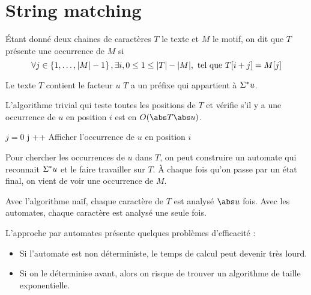 \section{String matching}

\begin{definition}
	Étant donné deux chaines de caractères $T$ le texte et $M$ le motif, on dit que $T$ présente une occurrence de $M$ si
	$$\forall j \in \left\{1,\ldots,|M| -1\right\}, \exists i, 0 \leq 1 \leq |T| - |M|, \text{ tel que } T[i + j] = M[j]$$
\end{definition}

\begin{remarque}
	Le texte $T$ contient le facteur $u$ \ssi $T$ a un préfixe qui appartient à $\Sigma^{*} u$.
\end{remarque}

\begin{remarque}
	L'algorithme trivial qui teste toutes les positions de $T$ et vérifie s'il y a une occurrence de $u$ en position $i$ est en $O(\abs T \abs u)$.

	\begin{algorithmic}[lines]
		\State $j = 0$
		\State j ++
		\EndIf
		\State Afficher l'occurrence de $u$ en position $i$
		\EndIf
		\EndFor
		\EndFunction
	\end{algorithmic}


\end{remarque}

\begin{remarque}
	Pour chercher les occurrences de $u$ dans $T$, on peut construire un automate qui reconnait $\Sigma^{*} u$ et le faire travailler sur $T$.
	À chaque fois qu'on passe par un état final, on vient de voir une occurrence de $M$.
\end{remarque}

\begin{remarque}
	Avec l'algorithme naïf, chaque caractère de $T$ est analysé $\abs u$ fois. Avec les automates, chaque caractère est analysé une seule fois.
\end{remarque}

\begin{remarque}
	L'approche par automates présente quelques problèmes d'efficacité :
	\begin{itemize}
		\item Si l'automate est non déterministe, le temps de calcul peut devenir très lourd.
		\item Si on le déterminise avant, alors on risque de trouver un algorithme de taille exponentielle.
	\end{itemize}
\end{remarque}

